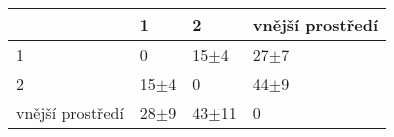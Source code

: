 \begin{tabular}{llll}
\toprule
{} &       1 &        2 & vnější prostředí \\
\midrule
1                &       0 &   15$\pm$4 &           27$\pm$7 \\
2                &  15$\pm$4 &        0 &           44$\pm$9 \\
vnější prostředí &  28$\pm$9 &  43$\pm$11 &                0 \\
\bottomrule
\end{tabular}
